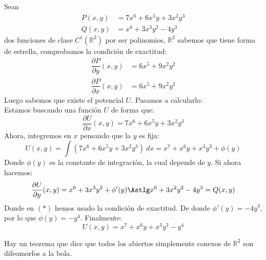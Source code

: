 \begin{ejemplo}
    Sean
    \begin{align*}
        P(x,y) &= 7x^6+6x^5y+3x^2y^3  \\
        Q(x,y) &= x^6+3x^3y^2 -4y^3
    \end{align*}
    dos funciones de clase $C^1(\mathbb{R}^2)$ por ser polinomios, $\mathbb{R}^2$ sabemos que tiene forma de estrella, comprobamos la condición de exactitud:
    \begin{align*}
        \dfrac{\partial P}{\partial y}(x,y) &= 6x^5+9x^2y^2 \\
        \dfrac{\partial P}{\partial x}(x,y) &= 6x^5+9x^2y^2
    \end{align*}
    Luego sabemos que existe el potencial $U$. Pasamos a calcularlo:\\

    Estamos buscando una función $U$ de forma que:
    \begin{equation*}
        \dfrac{\partial U}{\partial x}(x,y) = 7x^6+6x^5y+3x^2y^3
    \end{equation*}
    Ahora, integremos en $x$ pensando que la $y$ es fija:
    \begin{equation*}
        U(x,y) = \int (7x^6+6x^5y+3x^2y^3)~dx = x^7+x^6y+x^3y^3 + \phi(y)
    \end{equation*}
    Donde $\phi(y)$ es la constante de integración, la cual depende de $y$.
    Si ahora hacemos:
    \begin{equation*}
        \dfrac{\partial U}{\partial y}(x,y) = x^6+3x^3y^2 + \phi'(y) \AstIg x^6+3x^2y^2 -4y^3 = Q(x,y)
    \end{equation*}
    Donde en $(\ast)$ hemos usado la condición de exactitud.
    De donde $\phi'(y) = -4y^3$, por lo que $\phi(y) = -y^4$.
    Finalmente:
    \begin{equation*}
        U(x,y) = x^7+x^6y+x^3y^3 -y^4
    \end{equation*}
\end{ejemplo}


Hay un teorema que dice que todos los abiertos simplemente conexos de $\mathbb{R}^2$ son difeomorfos a la bola.\\


